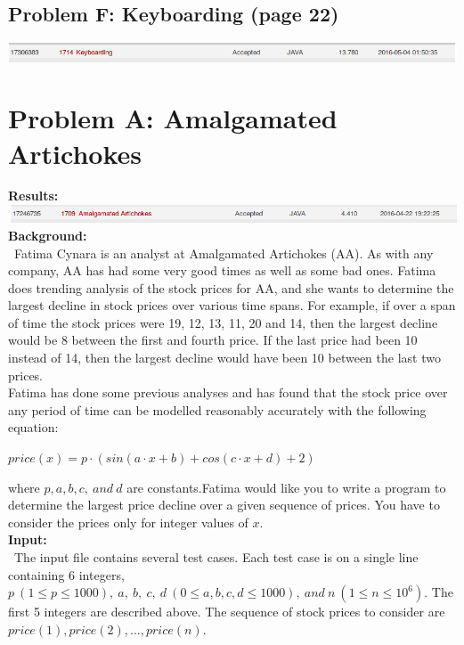 \documentclass[12pt]{article}
\begin{document}
\subsection{Problem F: Keyboarding (page 22)}
\includegraphics[width=\textwidth]{ProblemF}
\newpage


\section{Problem A: Amalgamated Artichokes}
\noindent \textbf{Results:} \\

\includegraphics[width=\textwidth]{ProblemA} \\

\noindent \textbf{Background:} \\
~\indent Fatima Cynara is an analyst at Amalgamated Artichokes (AA). As with any company, AA has had some
very good times as well as some bad ones. Fatima does trending analysis of the stock prices for AA, and she
wants to determine the largest decline in stock prices over various time spans. For example, if over a span
of time the stock prices were 19, 12, 13, 11, 20 and 14, then the largest decline would be 8 between the first
and fourth price. If the last price had been 10 instead of 14, then the largest decline would have been 10
between the last two prices. \\
\indent Fatima has done some previous analyses and has found that the stock price over any period of time can
be modelled reasonably accurately with the following equation:
\begin{center}$price(x) = p \cdot (sin(a\cdot x + b) + cos(c\cdot x + d) + 2)$\end{center}
where $p,a,b,c,\ and\ d$ are constants.Fatima would like you to write a program to determine the largest
price decline over a given sequence of prices. You have to consider the prices only for integer values of $x$. \\

\noindent \textbf{Input:} \\
~\indent The input file contains several test cases. Each test case is on a single line containing 6 integers,
$p\ (1 \leq p \leq 1000),\ a,\ b,\ c,\ d\ (0 \leq a,b,c,d \leq 1000),\ and\ n\ (1 \leq n \leq 10^6)$. The first
5 integers are described above. The sequence of stock prices to consider are $price(1), price(2),..., price(n).$ \\
\end{document}
